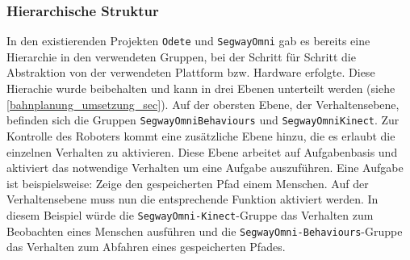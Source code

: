 \subsubsection{Hierarchische Struktur}
\label{integration_umsetzung_hierarchie_sec}

In den existierenden Projekten \lstinline{Odete} und \lstinline{SegwayOmni} gab es bereits eine Hierarchie 
in den verwendeten Gruppen, bei der Schritt für Schritt die Abstraktion von der verwendeten 
Plattform bzw. Hardware erfolgte. Diese Hierachie wurde beibehalten und kann in drei Ebenen unterteilt 
werden (siehe \ref{bahnplanung_umsetzung_sec}). Auf der obersten Ebene, der Verhaltensebene, befinden sich die 
Gruppen \lstinline{SegwayOmniBehaviours} und \lstinline{SegwayOmniKinect}. Zur Kontrolle des Roboters kommt 
eine zusätzliche Ebene hinzu, die es erlaubt die einzelnen Verhalten zu aktivieren. Diese Ebene arbeitet auf 
Aufgabenbasis und aktiviert das notwendige Verhalten um eine Aufgabe auszuführen. Eine Aufgabe ist 
beispielsweise: Zeige den gespeicherten Pfad einem Menschen. Auf der Verhaltensebene muss nun die entsprechende 
Funktion aktiviert werden. In diesem Beispiel würde die
\lstinline{SegwayOmni-}\lstinline{Kinect}-Gruppe das Verhalten zum Beobachten
eines Menschen ausführen und die \lstinline{SegwayOmni-Behaviours}-Gruppe das
Verhalten zum Abfahren eines gespeicherten Pfades.


